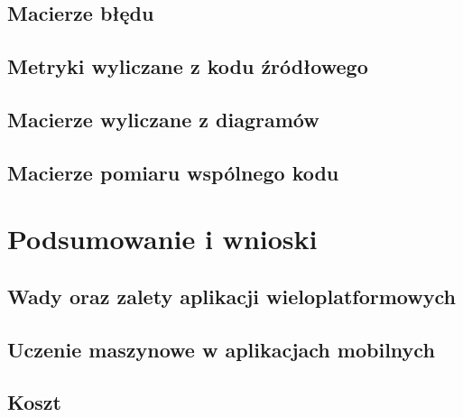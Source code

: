 \documentclass[brudnopis]{xmgr}
\begin{document}
\section{Macierze błędu}

\section{Metryki wyliczane z kodu źródłowego}

\section{Macierze wyliczane z diagramów}

\section{Macierze pomiaru wspólnego kodu}

\chapter{Podsumowanie i wnioski}

\section{Wady oraz zalety aplikacji wieloplatformowych}

\section{Uczenie maszynowe w aplikacjach mobilnych}

\section{Koszt}

\summary




\oswiadczenie
\end{document}
